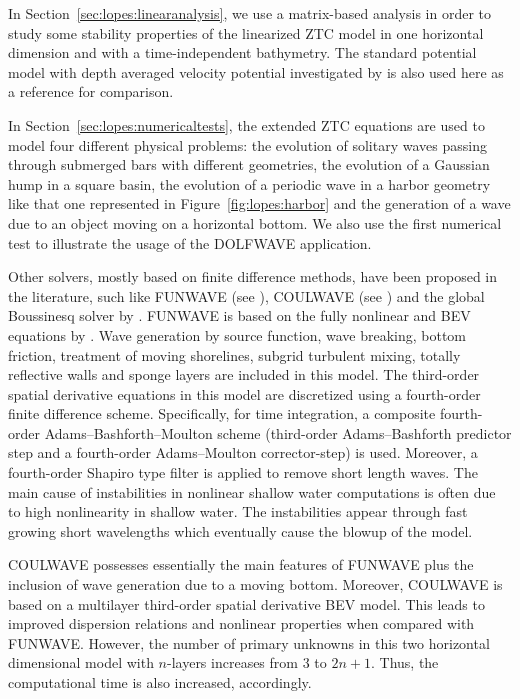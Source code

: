 In Section~\ref{sec:lopes:linearanalysis}, we use a matrix-based
analysis in order to study some stability properties of the linearized
ZTC model in one horizontal dimension and with a time-independent
bathymetry. The standard potential model with depth averaged velocity
potential investigated by \citet{LovholtPedersen2009} is also used
here as a reference for comparison.

In Section~\ref{sec:lopes:numericaltests}, the extended ZTC equations
are used to model four different physical problems: the evolution of
solitary waves passing through submerged bars with different
geometries, the evolution of a Gaussian hump in a square basin, the
evolution of a periodic wave in a harbor geometry like that one
represented in Figure~\ref{fig:lopes:harbor} and the generation of a
wave due to an object moving on a horizontal bottom. We also use the
first numerical test to illustrate the usage of the DOLFWAVE
application.

Other solvers, mostly based on finite difference methods, have been
proposed in the literature, such like FUNWAVE (see \citet{Kirby1998}),
COULWAVE (see \citet{LynettLiu2004}) and the global Boussinesq solver
by \citet{PedersenLovholt2008}.  FUNWAVE is based on the fully
nonlinear and BEV equations by \citet{WeiKirby1995}.  Wave generation
by source function, wave breaking, bottom friction, treatment of
moving shorelines, subgrid turbulent mixing, totally reflective walls
and sponge layers are included in this model.  The third-order spatial
derivative equations in this model are discretized using a
fourth-order finite difference scheme.  Specifically, for time
integration, a composite fourth-order Adams--Bashforth--Moulton scheme
(third-order Adams--Bashforth predictor step and a fourth-order
Adams--Moulton corrector-step) is used.  Moreover, a fourth-order
Shapiro type filter is applied to remove short length waves.  The main
cause of instabilities in nonlinear shallow water computations is
often due to high nonlinearity in shallow water.  The instabilities
appear through fast growing short wavelengths which eventually cause
the blowup of the model.

COULWAVE possesses essentially the main features of FUNWAVE plus the
inclusion of wave generation due to a moving bottom.  Moreover,
COULWAVE is based on a multilayer third-order spatial derivative BEV
model.  This leads to improved dispersion relations and nonlinear
properties when compared with FUNWAVE.  However, the number of primary
unknowns in this two horizontal dimensional model with $n$-layers
increases from $3$ to $2n+1$. Thus, the computational time is also
increased, accordingly.

